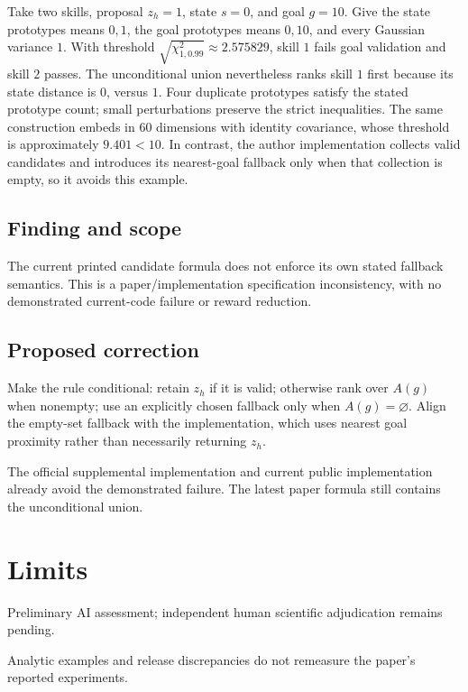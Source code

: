 \documentclass[11pt]{article}
\begin{document}
Take two skills, proposal \(z_h=1\), state \(s=0\), and goal \(g=10\). Give the state prototypes means \(0,1\), the goal prototypes means \(0,10\), and every Gaussian variance \(1\). With threshold \(\sqrt{\chi^2_{1,0.99}}\approx2.575829\), skill \(1\) fails goal validation and skill \(2\) passes. The unconditional union nevertheless ranks skill \(1\) first because its state distance is \(0\), versus \(1\). Four duplicate prototypes satisfy the stated prototype count; small perturbations preserve the strict inequalities. The same construction embeds in \(60\) dimensions with identity covariance, whose threshold is approximately \(9.401<10\). In contrast, the author implementation collects valid candidates and introduces its nearest-goal fallback only when that collection is empty, so it avoids this example.

\subsection*{Finding and scope}

The current printed candidate formula does not enforce its own stated fallback semantics. This is a paper/implementation specification inconsistency, with no demonstrated current-code failure or reward reduction.

\subsection*{Proposed correction}

Make the rule conditional: retain \(z_h\) if it is valid; otherwise rank over \(A(g)\) when nonempty; use an explicitly chosen fallback only when \(A(g)=\varnothing\). Align the empty-set fallback with the implementation, which uses nearest goal proximity rather than necessarily returning \(z_h\).

The official supplemental implementation and current public implementation already avoid the demonstrated failure. The latest paper formula still contains the unconditional union.

\section*{Limits}

Preliminary AI assessment; independent human scientific adjudication remains pending.\par

Analytic examples and release discrepancies do not remeasure the paper’s reported experiments.\par
\end{document}

